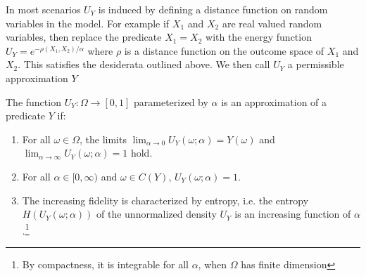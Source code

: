 
In most scenarios $U_Y$ is induced by defining a distance function on random variables in the model. 
For example if $X_1$ and $X_2$ are real valued random variables, then replace the predicate $X_1 = X_2$ with the energy function $U_Y = e^{-\rho(X_1, X_2) / \alpha}$ where $\rho$ is a distance function on the outcome space of $X_1$ and $X_2$.
This satisfies the desiderata outlined above.  We then call $U_Y$ a permissible approximation $Y$

\begin{definition}
The function $U_Y : \Omega \to [0, 1]$ parameterized by $\alpha$ is an approximation of a predicate $Y$ if:
\begin{enumerate}[label=(\roman*)]
	\label{def:temp}
	\item For all $\omega \in \Omega$, the limits $\lim_{\alpha \to 0}U_Y(\omega; \alpha) = Y(\omega)$ and $\lim_{\alpha \to \infty}U_Y(\omega; \alpha) = 1$ hold.
    \item For all $\alpha \in [0, \infty)$ and  $\omega \in C(Y)$, $U_Y(\omega; \alpha) = 1$.
    \item The increasing fidelity is characterized by entropy, i.e. the entropy $H(U_Y(\omega; \alpha))$ of the unnormalized density $U_Y$ is an increasing function of $\alpha$.\footnote
    {By compactness, it is integrable for all $\alpha$, when $\Omega$ has finite dimension}
\end{enumerate}
\end{definition}


